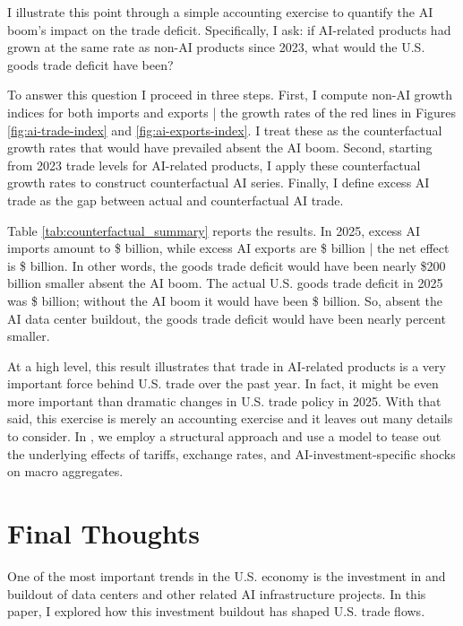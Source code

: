 \documentclass[12pt,pdftex]{article}
\begin{document}
\begin{onehalfspacing}
\afterpage{%
\clearpage

}

I illustrate this point through a simple accounting exercise to quantify the AI boom's impact on the trade deficit. Specifically, I ask: if AI-related products had grown at the same rate as non-AI products since 2023, what would the U.S. goods trade deficit have been?

To answer this question I proceed in three steps. First, I compute non-AI growth indices for both imports and exports | the growth rates of the red lines in Figures \ref{fig:ai-trade-index} and \ref{fig:ai-exports-index}. I treat these as the counterfactual growth rates that would have prevailed absent the AI boom. Second, starting from 2023 trade levels for AI-related products, I apply these counterfactual growth rates to construct counterfactual AI series. Finally, I define excess AI trade as the gap between actual and counterfactual AI trade.

Table \ref{tab:counterfactual_summary} reports the results. In 2025, excess AI imports amount to \$\cfExcessAiImports{} billion, while excess AI exports are \$\cfExcessAiExports{} billion | the net effect is \$\cfNetAiEffect{} billion. In other words, the goods trade deficit would have been nearly \$200 billion smaller absent the AI boom. The actual U.S. goods trade deficit in 2025 was \$\cfActualDeficit{} billion; without the AI boom it would have been \$\cfCounterfactualDeficit{} billion. So, absent the AI data center buildout, the goods trade deficit would have been nearly \cfDeficitReductionPct{} percent smaller.

At a high level, this result illustrates that trade in AI-related products is a very important force behind U.S. trade over the past year. In fact, it might be even more important than dramatic changes in U.S. trade policy in 2025. With that said, this exercise is merely an accounting exercise and it leaves out many details to consider. In \citet*{ferrante2026missingtrade}, we employ a structural approach and use a model to tease out the underlying effects of tariffs, exchange rates, and AI-investment-specific shocks on macro aggregates. 

\section{Final Thoughts}

One of the most important trends in the U.S. economy is the investment in and buildout of data centers and other related AI infrastructure projects. In this paper, I explored how this investment buildout has shaped U.S. trade flows. 


\end{onehalfspacing}
\end{document}
